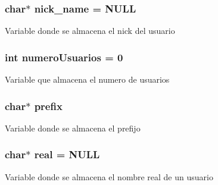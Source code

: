\subsubsection[{\texorpdfstring{nick\+\_\+name}{nick_name}}]{\setlength{\rightskip}{0pt plus 5cm}char$\ast$ nick\+\_\+name = N\+U\+LL}\hypertarget{_g-2361-06-_p1-_server_8c_aabbf66718cda228b924a4a9441eadf62}{}\label{_g-2361-06-_p1-_server_8c_aabbf66718cda228b924a4a9441eadf62}
Variable donde se almacena el nick del usuario 
\subsubsection[{\texorpdfstring{numero\+Usuarios}{numeroUsuarios}}]{\setlength{\rightskip}{0pt plus 5cm}int numero\+Usuarios = 0}\hypertarget{_g-2361-06-_p1-_server_8c_ac9a5ec6f534d2a8e2a870179807d32dc}{}\label{_g-2361-06-_p1-_server_8c_ac9a5ec6f534d2a8e2a870179807d32dc}
Variable que almacena el numero de usuarios 
\subsubsection[{\texorpdfstring{prefix}{prefix}}]{\setlength{\rightskip}{0pt plus 5cm}char$\ast$ prefix}\hypertarget{_g-2361-06-_p1-_server_8c_ad2849cf781a4db22cc1b31eaaee50a4f}{}\label{_g-2361-06-_p1-_server_8c_ad2849cf781a4db22cc1b31eaaee50a4f}
Variable donde se almacena el prefijo 
\subsubsection[{\texorpdfstring{real}{real}}]{\setlength{\rightskip}{0pt plus 5cm}char$\ast$ real = N\+U\+LL}\hypertarget{_g-2361-06-_p1-_server_8c_af832f551e1c343666c3d2a55834139a0}{}\label{_g-2361-06-_p1-_server_8c_af832f551e1c343666c3d2a55834139a0}
Variable donde se almacena el nombre real de un usuario 
